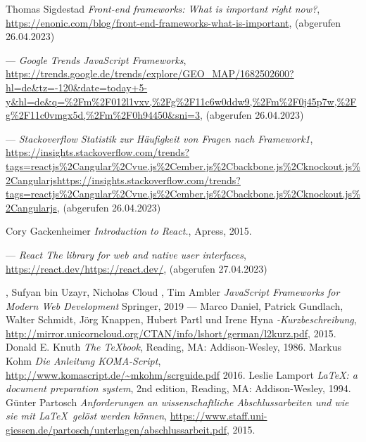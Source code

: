 %

\begin{thebibliography}{99}

    Thomas Sigdestad
	\emph{Front-end frameworks: What is important right now?},
	\url{https://enonic.com/blog/front-end-frameworks-what-is-important},
    (abgerufen 26.04.2023)

	---
	\emph{Google Trends JavaScript Frameworks},
	\url{https://trends.google.de/trends/explore/GEO_MAP/1682502600?hl=de&tz=-120&date=today+5-y&hl=de&q=%2Fm%2F012l1vxv,%2Fg%2F11c6w0ddw9,%2Fm%2F0j45p7w,%2Fg%2F11c0vmgx5d,%2Fm%2F0h94450&sni=3},
	(abgerufen 26.04.2023)

	---
	\emph{Stackoverflow Statistik zur Häufigkeit von Fragen nach Framework1},
	\url{https://insights.stackoverflow.com/trends?tags=reactjs%2Cangular%2Cvue.js%2Cember.js%2Cbackbone.js%2Cknockout.js%2Cangularjshttps://insights.stackoverflow.com/trends?tags=reactjs%2Cangular%2Cvue.js%2Cember.js%2Cbackbone.js%2Cknockout.js%2Cangularjs},
	(abgerufen 26.04.2023)

	Cory Gackenheimer
	\emph{Introduction to React.},
	Apress,
	2015.

	---
	\emph{React
	The library for web and native user interfaces},
	\url{https://react.dev/https://react.dev/},
	(abgerufen 27.04.2023)

,
	Sufyan bin Uzayr, Nicholas Cloud , Tim Ambler
	\emph{JavaScript Frameworks for Modern Web Development}
	Springer,
	2019
---
	Marco Daniel, Patrick Gundlach, Walter Schmidt, Jörg Knappen, Hubert
	Partl und Irene Hyna
	\emph{\LaTeXe-Kurzbeschreibung},
	\url{http://mirror.unicorncloud.org/CTAN/info/lshort/german/l2kurz.pdf},
	2015.
	Donald E. Knuth
	\emph{The \TeX book},
  Reading, MA: Addison-Wesley,
	1986.
	Markus Kohm
	\emph{Die Anleitung \textsf{KOMA-Script}},
	\url{http://www.komascript.de/~mkohm/scrguide.pdf}
	2016.
  Leslie Lamport
  \emph{\LaTeX: a document preparation system},
  2nd edition,
  Reading, MA: Addison-Wesley,
  1994.
	Günter Partosch
	\emph{Anforderungen an wissenschaftliche Abschlussarbeiten und wie sie
	mit \LaTeX\ gelöst werden können},
	\url{https://www.staff.uni-giessen.de/partosch/unterlagen/abschlussarbeit.pdf},
	2015.

\end{thebibliography}

